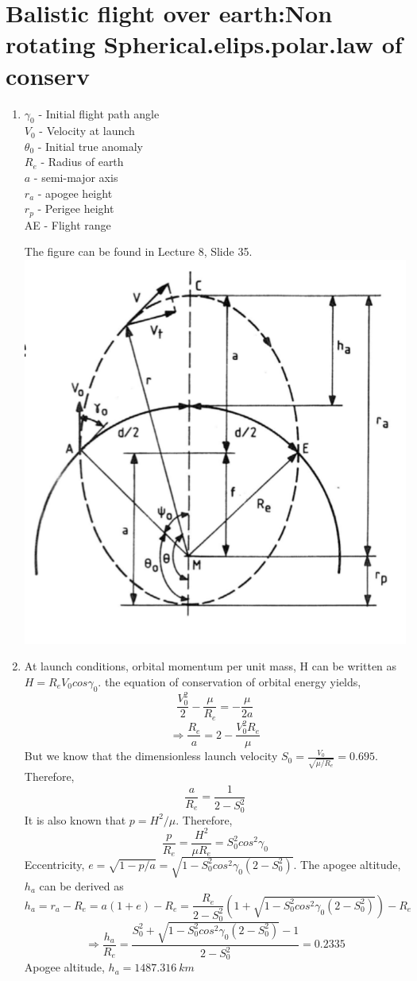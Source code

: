 \section{ Balistic flight over earth:Non rotating Spherical.elips.polar.law of conserv }\label{sec:q3}    
\begin{enumerate}[label=(\alph*)]
\item
$\gamma_0$ - Initial flight path angle\\
$V_0$ - Velocity at launch\\
$\theta_0$ - Initial true anomaly\\
$R_e$ - Radius of earth\\
$a$ - semi-major axis\\
$r_a$ - apogee height\\
$r_p$ - Perigee height\\
AE - Flight range

The figure can be found in Lecture 8, Slide 35.\\
\includegraphics[scale=0.6]{3a.PNG}

\item
At launch conditions, orbital momentum per unit mass, H can be written as $H=R_eV_0cos\gamma_0$. the equation of conservation of orbital energy yields,
$$\frac{V_0^2}{2}-\frac{\mu}{R_e}=-\frac{\mu}{2a}$$
$$\Rightarrow \frac{R_e}{a}=2-\frac{V_0^2R_e}{\mu}$$
But we know that the dimensionless launch velocity $S_0=\frac{V_0}{\sqrt{\mu/R_e}}=0.695$. Therefore, $$\frac{a}{R_e} = \frac{1}{2-S_0^2}$$
It is also known that $p=H^2/\mu$. Therefore,
$$\frac{p}{R_e}=\frac{H^2}{\mu R_e}=S_0^2 cos^2 \gamma_0$$
Eccentricity, $e=\sqrt{1-p/a}=\sqrt{1-S_0^2cos^2 \gamma_0(2-S_0^2)}$.
The apogee altitude, $h_a$ can be derived as
$$h_a = r_a-R_e = a(1+e)-R_e = \frac{R_e}{2-S_0^2}(1+\sqrt{1-S_0^2cos^2\gamma_0(2-S_0^2)})-R_e$$
$$\Rightarrow \frac{h_a}{R_e} = \frac{S_0^2+\sqrt{1-S_0^2cos^2\gamma_0(2-S_0^2)}-1}{2-S_0^2}=0.2335$$
Apogee altitude, $h_a=1487.316\: km$


\end{enumerate}
